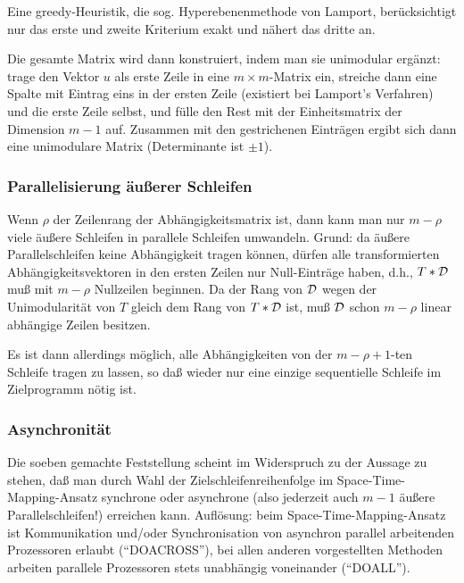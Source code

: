 Eine greedy-Heuristik, die sog. Hyperebenenmethode von Lamport,
berücksichtigt nur das erste und zweite Kriterium exakt und nähert das
dritte an.

\smallskip

Die gesamte Matrix wird dann konstruiert, indem man sie unimodular
ergänzt: trage den Vektor $u$ als erste Zeile in eine
$m\!\times\!m$-Matrix ein, streiche dann eine Spalte mit Eintrag eins in
der ersten Zeile (existiert bei Lamport's Verfahren) und die erste Zeile
selbst, und fülle den Rest mit der Einheitsmatrix der Dimension
$m\!-\!1$ auf. Zusammen mit den gestrichenen Einträgen ergibt sich dann
eine unimodulare Matrix (Determinante ist $\pm 1$).


\subsubsection{Parallelisierung äußerer Schleifen}
\label{sec:pas}

Wenn $\rho$ der Zeilenrang der Abhängigkeitsmatrix ist, dann kann man
nur $m\!-\!\rho$ viele äußere Schleifen in parallele Schleifen umwandeln.
Grund: da äußere Parallelschleifen keine Abhängigkeit tragen können,
dürfen alle transformierten Abhängigkeitsvektoren in den ersten Zeilen
nur Null-Einträge haben, d.h., $T*\cal D$ muß mit $m\!-\!\rho$
Nullzeilen beginnen. Da der Rang von $\cal D$ wegen der Unimodularität
von $T$ gleich dem Rang von $T*\cal D$ ist, muß $\cal D$ schon $m\!-\!\rho$
linear abhängige Zeilen besitzen.

Es ist dann allerdings möglich, alle Abhängigkeiten von der
$m\!-\!\rho\!+\!1$-ten Schleife tragen zu lassen, so daß wieder nur eine
einzige sequentielle Schleife im Zielprogramm nötig ist.

\subsubsection{Asynchronität}

Die soeben gemachte Feststellung scheint im Widerspruch zu der Aussage
zu stehen, daß man durch Wahl der Zielschleifenreihenfolge im
Space-Time-Mapping-Ansatz synchrone oder asynchrone (also jederzeit auch
$m\!-\!1$ äußere Parallelschleifen!) erreichen kann. Auflösung: beim
Space-Time-Mapping-Ansatz ist Kommunikation und/oder Synchronisation von
asynchron parallel arbeitenden Prozessoren erlaubt (``DOACROSS''), bei allen
anderen vorgestellten Methoden arbeiten parallele Prozessoren stets
unabhängig voneinander (``DOALL'').


